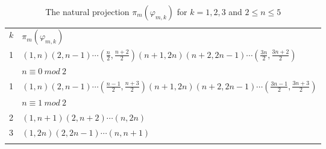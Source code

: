 \documentclass[12pt,a4paper]{article}
\numberwithin{equation}{section}
\numberwithin{table}{section}
\begin{document}
%
\begin{table}[!htbp]
\centering
\footnotesize
\captionsetup{font=footnotesize}
\caption{The natural projection $\pi_m(\varphi_{m,k})$ for $k=1,2,3$ and $2 \leq n \leq 5$}
\label{tab:Data_NaturalProjectionOfPhimk}
\begin{tabular}{ll}
\hline\noalign{\smallskip}
$k$ & $\pi_m(\varphi_{m,k})$ \\
\noalign{\smallskip}\hline\noalign{\smallskip}
1 & $(1,n)(2,n-1)\cdots (\frac{n}{2},\frac{n+2}{2})(n+1,2n)(n+2,2n-1)\cdots (\frac{3n}{2},\frac{3n+2}{2})$ \\
  & $n \equiv 0\: mod\: 2$ \\
\noalign{\smallskip}\hline\noalign{\smallskip}
1 & $(1,n)(2,n-1)\cdots (\frac{n-1}{2},\frac{n+3}{2})(n+1,2n)(n+2,2n-1)\cdots (\frac{3n-1}{2},\frac{3n+3}{2})$ \\
  & $n \equiv 1\: mod\: 2$ \\
\noalign{\smallskip}\hline\noalign{\smallskip}
2 & $(1,n+1)(2,n+2) \cdots (n,2n)$ \\
\noalign{\smallskip}\hline\noalign{\smallskip}
3 & $(1,2n)(2,2n-1) \cdots (n,n+1)$ \\
\noalign{\smallskip}\hline
\end{tabular}
\end{table}
%
\end{document}
